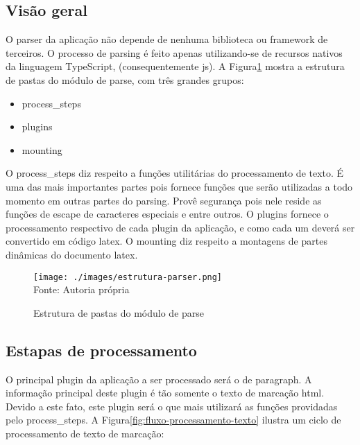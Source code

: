 \subsection{Visão geral}

O parser da aplicação não depende de nenhuma biblioteca
ou framework de terceiros. O processo de parsing é feito
apenas utilizando-se de recursos nativos da linguagem
TypeScript, (consequentemente
\acrshort{js}).
A
Figura\ref{fig:estrutura-parser}
mostra a estrutura de pastas do módulo de parse, com três grandes
grupos:

\begin{itemize}
        
	\item process\_steps
	\item plugins
	\item mounting
    
\end{itemize}

O process\_steps diz respeito a funções utilitárias do processamento de texto.
É uma das mais importantes partes pois fornece funções que serão utilizadas a todo
momento em outras partes do parsing. Provê segurança pois nele reside as funções
de escape de caracteres especiais e entre outros.
O plugins fornece o processamento respectivo de cada plugin da aplicação,
e como cada um deverá ser convertido em código
\acrshort{latex}.
O mounting diz respeito a montagens de partes dinâmicas do documento
\acrshort{latex}.

\begin{figure}[H]
    \centering
    \caption{Estrutura de pastas do módulo de parse}
    \texttt{[image: ./images/estrutura-parser.png]}
    \label{fig:estrutura-parser} \\
    \textnormal{\fontsize{10pt}{12pt}Fonte: Autoria própria}
\end{figure}

\subsection{Estapas de processamento}

O principal plugin da aplicação a ser processado será o de paragraph.
A informação principal deste plugin é tão somente o texto de marcação
\acrshort{html}. Devido a este fato, este plugin
será o que mais utilizará as funções providadas pelo process\_steps.
A
Figura\ref{fig:fluxo-processamento-texto}
ilustra um ciclo de processamento de texto de marcação:

